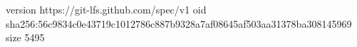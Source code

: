 version https://git-lfs.github.com/spec/v1
oid sha256:56c9834c0e43719c1012786c887b9328a7af08645af503aa31378ba308145969
size 5495
